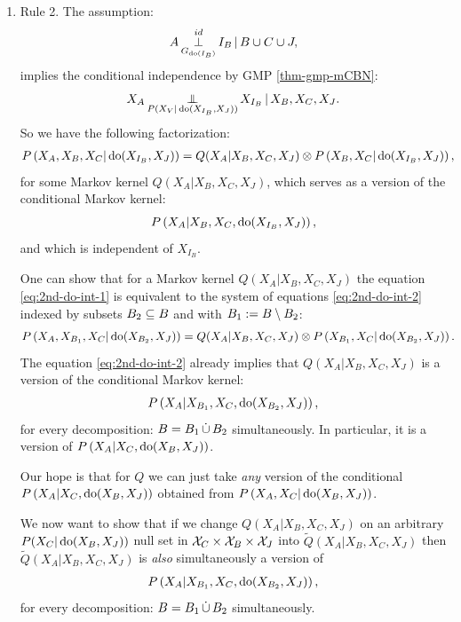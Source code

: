 {\begin{enumerate}
    In other words: 
    $$\sum_{x_C} q(x_A|x_C,x_J) p(x_C|\doit(x_J)) = \sum_{x_C} \tilde q(x_A|x_C,x_J) p(x_C|\doit(x_J))$$
    implies
    $$\sum_{x_C} q(x_A|x_C,x_J) p(x_B,x_C|\doit(x_J)) = \sum_{x_C} \tilde q(x_A|x_C,x_J) p(x_B,x_C|\doit(x_J))$$
    REEALLY? Yes.
  \item Rule 2.
    The assumption:
            \[ A \operatorname*{\perp}^{id}_{G_{\operatorname{do}(I_B)}} I_B \operatorname*{|} B \cup C \cup J,   \]
implies the conditional independence by GMP \ref{thm-gmp-mCBN}:
  \[ X_A \operatorname*{\perp\mkern-11mu\perp}_{P(X_V|\operatorname{do}(X_{I_B},X_{J}))} X_{I_B} \operatorname*{|} X_B,X_C,X_J.\]
So we have the following factorization:
\begin{align}
    P\left ( X_A,X_B,X_C|\operatorname{do}(X_{I_B},X_{J})\right ) &= Q(X_A|X_B,X_C,X_J) \otimes P\left ( X_B,X_C|\operatorname{do}(X_{I_B},X_{J})\right ),\label{eq:2nd-do-int-1}  
\end{align}
for some Markov kernel $Q(X_A|X_B,X_C,X_J)$, which serves as a version of the conditional Markov kernel:
  \[P\left ( X_A|X_B,X_C,\operatorname{do}(X_{I_B},X_{J})\right ),\]
and which is independent of $X_{I_B}$.

One can show that for a Markov kernel $Q(X_A|X_B,X_C,X_J)$ the equation \ref{eq:2nd-do-int-1} is equivalent to the system of equations \ref{eq:2nd-do-int-2} indexed by subsets $B_2 \subseteq B$ and with $B_1 := B \setminus B_2$:
\begin{align}
    P\left ( X_A,X_{B_1},X_C|\operatorname{do}(X_{B_2},X_{J})\right ) &= Q(X_A|X_B,X_C,X_J) \otimes P\left ( X_{B_1},X_C|\operatorname{do}(X_{B_2},X_{J})\right ). \label{eq:2nd-do-int-2} 
\end{align}
The equation \ref{eq:2nd-do-int-2} already implies that $Q(X_A|X_B,X_C,X_J)$ is a version of the conditional Markov kernel:
\begin{align} P\left ( X_A|X_{B_1},X_C,\operatorname{do}(X_{B_2},X_{J})\right ), \label{eq:2nd-do-int-4} 
\end{align}
for every decomposition: $B=B_1 \,\dot{\cup}\, B_2$ simultaneously.
In particular, it is a version of $ P\left ( X_A|X_C,\operatorname{do}(X_B,X_{J})\right ) $.

Our hope is that for $Q$ we can just take \emph{any} version of the conditional $P\left ( X_A|X_C,\operatorname{do}(X_B,X_{J})\right )$ obtained from $P \left ( X_A,X_C|\operatorname{do}(X_B,X_J)\right )$.

    We now want to show that if we change $Q(X_A|X_B,X_C,X_J)$ on an arbitrary $P(X_C|\operatorname{do}(X_B,X_J))$ null set in $\mathcal{X}_C \times \mathcal{X}_B \times \mathcal{X}_J$ into $\tilde Q(X_A|X_B,X_C,X_J)$
    then $\tilde Q(X_A|X_B,X_C,X_J)$ is \emph{also} simultaneously a version of 
    \begin{align} P\left ( X_A|X_{B_1},X_C,\operatorname{do}(X_{B_2},X_{J})\right ), \label{eq:2nd-do-int-4} 
    \end{align}
    for every decomposition: $B=B_1 \,\dot{\cup}\, B_2$ simultaneously.


\end{enumerate}}
